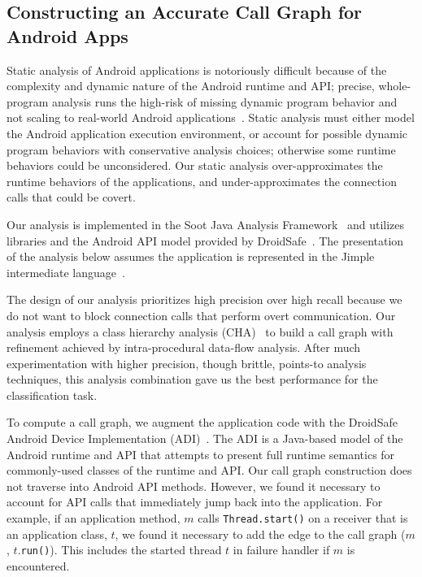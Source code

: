 
\subsection{Constructing an Accurate Call Graph for Android Apps }

Static analysis of Android applications is notoriously difficult
because of the complexity and dynamic nature of the Android runtime
and API; precise, whole-program analysis runs the high-risk of missing
dynamic program behavior and not scaling to real-world Android
applications~\cite{Gordon:Kim:Perkins:Gilham:Nguyen:Rinard:NDSS15}.
Static analysis must either model the Android application execution
environment, or account for possible dynamic program behaviors with
conservative analysis choices; otherwise some runtime behaviors could
be unconsidered.  Our static analysis over-approximates the runtime
behaviors of the applications, and under-approximates the connection
calls that could be covert.
 
Our analysis is implemented in the Soot Java
Analysis Framework~\cite{Vallee-Rai2000} and utilizes libraries and
the Android API model provided by
DroidSafe~\cite{Gordon:Kim:Perkins:Gilham:Nguyen:Rinard:NDSS15}. The
presentation of the analysis below assumes the application is
represented in the Jimple intermediate language~\cite{Vallee-Rai2000}.

The design of our analysis prioritizes high precision over high recall
because we do not want to block connection calls that perform
overt communication. Our analysis employs a class hierarchy
analysis (CHA)~\cite{Dean1995} to build a call graph with refinement
achieved by intra-procedural data-flow analysis.  After much
experimentation with higher precision, though brittle, points-to
analysis techniques, this analysis combination gave us the best
performance for the classification task.
   
To compute a call graph, we augment the application code with the
DroidSafe Android Device Implementation
(ADI)~\cite{Gordon:Kim:Perkins:Gilham:Nguyen:Rinard:NDSS15}.  The ADI
is a Java-based model of the Android runtime and API that attempts to
present full runtime semantics for commonly-used classes of the
runtime and API.  Our call graph construction does not traverse into
Android API methods.  However, we found it necessary to account for
API calls that immediately jump back into the application.  For
example, if an application method, $m$ calls
\lstinline!Thread.start()! on a receiver that is an application class,
$t$, we found it necessary to add the edge to the call graph ($m$,
$t$.\lstinline!run()!).  This includes the started thread $t$ in
failure handler if $m$ is encountered.

